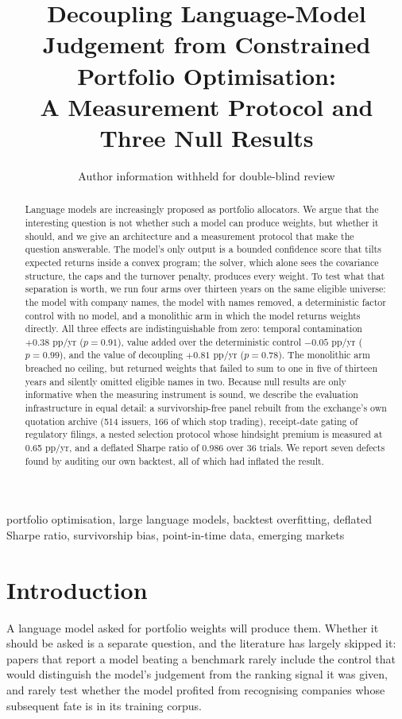 \documentclass[10pt,conference]{IEEEtran}
\title{Decoupling Language-Model Judgement from Constrained Portfolio Optimisation:\\A Measurement Protocol and Three Null Results}
\author{Author information withheld for double-blind review}
\begin{document}
\maketitle

\begin{abstract}
Language models are increasingly proposed as portfolio allocators. We argue that the interesting question is not whether such a model can produce weights, but whether it should, and we give an architecture and a measurement protocol that make the question answerable. The model's only output is a bounded confidence score that tilts expected returns inside a convex program; the solver, which alone sees the covariance structure, the caps and the turnover penalty, produces every weight. To test what that separation is worth, we run four arms over thirteen years on the same eligible universe: the model with company names, the model with names removed, a deterministic factor control with no model, and a monolithic arm in which the model returns weights directly. All three effects are indistinguishable from zero: temporal contamination $+0.38$ pp/yr ($p=0.91$), value added over the deterministic control $-0.05$ pp/yr ($p=0.99$), and the value of decoupling $+0.81$ pp/yr ($p=0.78$). The monolithic arm breached no ceiling, but returned weights that failed to sum to one in five of thirteen years and silently omitted eligible names in two. Because null results are only informative when the measuring instrument is sound, we describe the evaluation infrastructure in equal detail: a survivorship-free panel rebuilt from the exchange's own quotation archive (514 issuers, 166 of which stop trading), receipt-date gating of regulatory filings, a nested selection protocol whose hindsight premium is measured at 0.65 pp/yr, and a deflated Sharpe ratio of 0.986 over 36 trials. We report seven defects found by auditing our own backtest, all of which had inflated the result.
\end{abstract}

\begin{IEEEkeywords}
portfolio optimisation, large language models, backtest overfitting, deflated Sharpe ratio, survivorship bias, point-in-time data, emerging markets
\end{IEEEkeywords}

\section{Introduction}

A language model asked for portfolio weights will produce them. Whether it should be asked is a separate question, and the literature has largely skipped it: papers that report a model beating a benchmark rarely include the control that would distinguish the model's judgement from the ranking signal it was given, and rarely test whether the model profited from recognising companies whose subsequent fate is in its training corpus.
\end{document}
